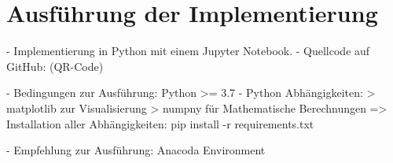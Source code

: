 \chapter{Ausführung der Implementierung}

- Implementierung in Python mit einem Jupyter Notebook. 
- Quellcode auf GitHub: (QR-Code)

- Bedingungen zur Ausführung: Python >= 3.7
- Python Abhängigkeiten:
	> matplotlib zur Visualisierung
	> numpny für Mathematische Berechnungen
	=> Installation aller Abhängigkeiten: pip install -r requirements.txt

- Empfehlung zur Ausführung: Anacoda Environment
